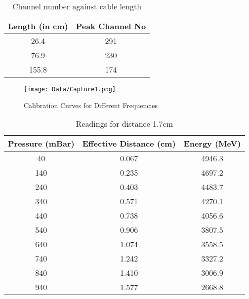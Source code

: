 \documentclass[a4paper]{article}
\begin{document}
\begin{table}[H]
\begin{center}
\begin{tabular}{@{}cc@{}}
\toprule
Length (in cm) & Peak Channel No \\ \midrule
26.4           & 291             \\
76.9           & 230             \\
155.8          & 174             \\ \bottomrule
\end{tabular}
\caption{Channel number against cable length}
\end{center}
\end{table}


\begin{center}
\begin{figure}[H]
	\begin{center}
  \texttt{[image: Data/Capture1.png]}
  \caption{Calibration Curves for Different Frequencies}
  \end{center}
\end{figure}
\end{center}


\begin{table}[H]
\begin{center}
\begin{tabular}{@{}ccc@{}}
\toprule
Pressure (mBar) & Effective Distance (cm) & Energy (MeV) \\ \midrule
40              & 0.067                   & 4946.3       \\
140             & 0.235                   & 4697.2       \\
240             & 0.403                   & 4483.7       \\
340             & 0.571                   & 4270.1       \\
440             & 0.738                   & 4056.6       \\
540             & 0.906                   & 3807.5       \\
640             & 1.074                   & 3558.5       \\
740             & 1.242                   & 3327.2       \\
840             & 1.410                   & 3006.9       \\
940             & 1.577                   & 2668.8       \\ \bottomrule
\end{tabular}
\caption{Readings for distance 1.7cm}
\end{center}
\end{table}
\end{document}
